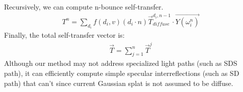 Recursively, we can compute n-bounce self-transfer.
\begin{align}
   T^{n}=\sum_{d_i}f(d_i,v)(d_i \cdot n)\Vec{T}_{diffuse}^{d_i,n-1} \cdot \Vec{Y(\omega_i^{n})} \label{self transfer}
\end{align}
Finally, the total self-transfer vector is:
\begin{align}
   \Vec{T}=\sum_{j=1}^{n}\Vec{T}^{j}
\end{align}
Although our method may not address specialized light paths (such as SDS path), it can efficiently compute simple specular interreflections (such as SD path) that \cite{liang2023gsir,gao2023relightable,shi2023gir} can't since current Gaussian splat is not assumed to be diffuse.
    
